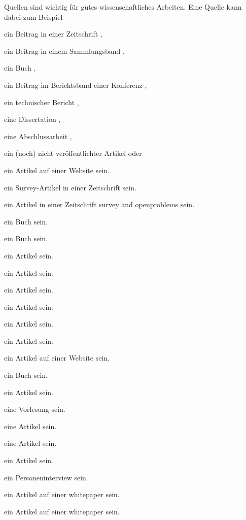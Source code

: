 Quellen sind wichtig für gutes wissenschaftliches Arbeiten. Eine Quelle kann dabei zum Beispiel
\begin{compactitem}
  \item ein Beitrag in einer Zeitschrift \cite{MopOverview},
  \item ein Beitrag in einem Sammlungsband \cite{moore},
  \item ein Buch \cite{scala},
  \item ein Beitrag im Berichtsband einer Konferenz \cite{rltl},
  \item ein technischer Bericht \cite{bitkom},
  \item eine Dissertation \cite{Leucker02},
  \item eine Abschlussarbeit \cite{RltlConv},
  \item ein (noch) nicht veröffentlichter Artikel \cite{ptLTL} oder
  \item ein Artikel auf einer Website \cite{codecommit} sein.
  \item ein Survey-Artikel in einer Zeitschrift \cite{LLM4SE} sein.
  \item ein Artikel in einer Zeitschrift survey and openproblems \cite{LLM4SE2} sein.
  \item ein Buch \cite{sommerville2016software} sein.
  \item ein Buch \cite{seacord2003modernizing} sein.
  \item ein Artikel \cite{chikofsky1990reverse} sein.
  \item ein Artikel \cite{fan2023largelanguagemodelssoftware} sein.
  \item ein Artikel \cite{LLMinSEreviewandvision} sein.
  \item ein Artikel \cite{chen2021evaluatinglargelanguagemodels} sein.
  \item ein Artikel \cite{reynolds2021promptprogramminglargelanguage} sein.
  \item ein Artikel \cite{seemann2023ki} sein.
  \item ein Artikel auf einer Website \cite{zhang2023survey} sein.
  \item ein Buch \cite{boonstra2024prompt} sein.
  \item ein Artikel \cite{agarwal2024legacy} sein.
  \item eine Vorlesung \cite{leucker2024anforderungen} sein.
  \item eine Artikel \cite{brown2020languagemodelsfewshotlearners} sein.
  \item eine Artikel \cite{inproceedings} sein.  
  \item ein Artikel \cite{hou2024largelanguagemodelssoftware} sein.
  \item ein Personeninterview \cite{Schmalz2026} sein.
  \item ein Artikel auf einer whitepaper \cite{boonstra2023prompt} sein.
  \item ein Artikel auf einer whitepaper \cite{ray2024vibecoding} sein.
\end{compactitem}

